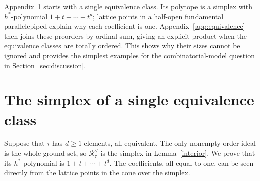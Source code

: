\documentclass[11pt,reqno]{amsart}
\numberwithin{equation}{section}
\theoremstyle{definition}
\theoremstyle{remark}
\theoremstyle{definition}
\newcommand{\Rpoly}[1]{\mathcal R_{#1}^{\vee}}
\begin{document}
Appendix~\ref{app:single} starts with a single equivalence class. Its polytope is a simplex with $h^*$-polynomial $1+t+\cdots+t^d$; lattice points in a half-open fundamental parallelepiped explain why each coefficient is one. Appendix~\ref{app:equivalence} then joins these preorders by ordinal sum, giving an explicit product when the equivalence classes are totally ordered. This shows why their sizes cannot be ignored and provides the simplest examples for the combinatorial-model question in Section~\ref{sec:discussion}.

\section{The simplex of a single equivalence class}\label{app:single}

Suppose that $\tau$ has $d\ge1$ elements, all equivalent. The only nonempty order ideal is the whole ground set, so $\Rpoly{\tau}$ is the simplex in Lemma~\ref{interior}. We prove that its $h^*$-polynomial is $1+t+\cdots+t^d$. The coefficients, all equal to one, can be seen directly from the lattice points in the cone over the simplex.
\end{document}
